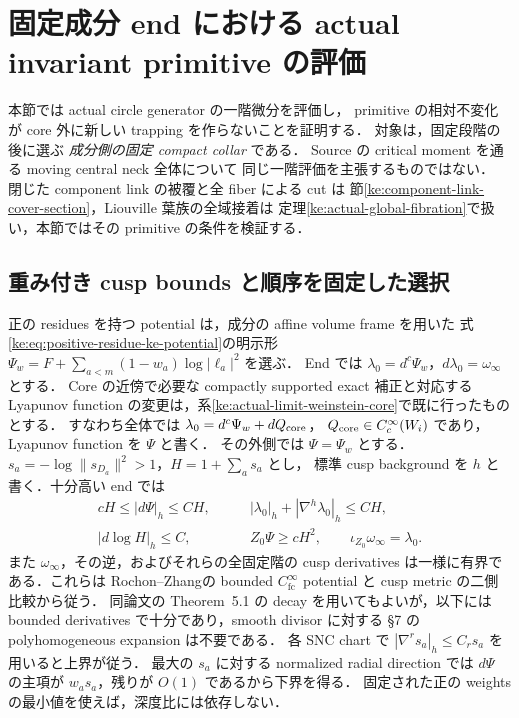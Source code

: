 \section{固定成分 end における actual invariant primitive の評価}
\label{ke:core-invariant-primitive-section}

本節では actual circle generator の一階微分を評価し，
primitive の相対不変化が core 外に新しい trapping を作らないことを証明する．
対象は，固定段階の後に選ぶ \emph{成分側の固定 compact collar} である．
Source の critical moment を通る moving central neck 全体について
同じ一階評価を主張するものではない．
閉じた component link の被覆と全 fiber による cut は
節\ref{ke:component-link-cover-section}，Liouville 葉族の全域接着は
定理\ref{ke:actual-global-fibration}で扱い，本節ではその primitive の条件を検証する．

\subsection{重み付き cusp bounds と順序を固定した選択}

正の residues を持つ potential は，成分の affine volume frame を用いた
式\eqref{ke:eq:positive-residue-ke-potential}の明示形
$\Psi_w=F+\sum_{a<m}(1-w_a)\log|\ell_a|^2$ を選ぶ．
End では $\lambda_0=d^c\Psi_w$，$d\lambda_0=\omega_\infty$ とする．
Core の近傍で必要な compactly supported exact 補正と対応する Lyapunov
function の変更は，系\ref{ke:actual-limit-weinstein-core}で既に行ったものとする．
すなわち全体では $\lambda_0=d^c\Psi_w+dQ_{\rm core}$，
$Q_{\rm core}\in C_c^\infty(W_i)$ であり，Lyapunov function を $\Psi$ と書く．
その外側では $\Psi=\Psi_w$ とする．
$s_a=-\log\|s_{D_a}\|^2>1$，$H=1+\sum_a s_a$ とし，
標準 cusp background を $h$ と書く．十分高い end では
\begin{equation}\label{ke:eq:weighted-core-input}
 \begin{split}
 cH\le |d\Psi|_h\le CH,&\qquad
 |\lambda_0|_h+|\nabla^h\lambda_0|_h\le CH,\\
 |d\log H|_h\le C,&\qquad Z_0\Psi\ge cH^2,
 \qquad \iota_{Z_0}\omega_\infty=\lambda_0.
 \end{split}
\end{equation}
また $\omega_\infty$，その逆，およびそれらの全固定階の cusp derivatives
は一様に有界である．これらは
Rochon--Zhang\cite[\S5, (5.3)--(5.6) と直後の段落]{RochonZhang}の
bounded $C^\infty_{\mathrm{fc}}$ potential と cusp metric の二側比較から従う．
同論文の Theorem~5.1 の decay を用いてもよいが，以下には bounded derivatives
で十分であり，smooth divisor に対する \S7 の polyhomogeneous expansion は不要である．
各 SNC chart で $|\nabla^r s_a|_h\le C_r s_a$ を用いると上界が従う．
最大の $s_a$ に対する normalized radial direction では
$d\Psi$ の主項が $w_a s_a$，残りが $O(1)$ であるから下界を得る．
固定された正の weights の最小値を使えば，深度比には依存しない．

